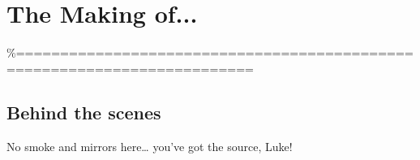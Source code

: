\chapter{The Making of...} \label{appendix}

\%=========================================================================

\section{Behind the scenes}\label{behind-the-scenes}

No smoke and mirrors here\ldots{} you've got the source, Luke!
